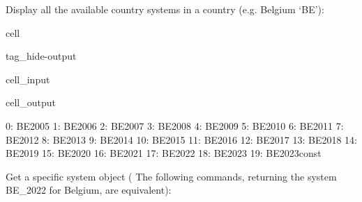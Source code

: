 \documentclass[letterpaper,10pt,english]{sphinxmanual}
\begin{document}
\sphinxAtStartPar
Display all the available country systems in a country (e.g. Belgium ‘BE’):

\begin{sphinxuseclass}{cell}
\begin{sphinxuseclass}{tag_hide-output}
\begin{sphinxuseclass}{cell_input}
\begin{sphinxVerbatim}[commandchars=\\\{\}]
\PYG{p}{[}\PYG{p}{]}
\end{sphinxVerbatim}

\end{sphinxuseclass}
\begin{sphinxuseclass}{cell_output}
\begin{sphinxVerbatim}[commandchars=\\\{\}]
0: BE\PYGZus{}2005       
1: BE\PYGZus{}2006       
2: BE\PYGZus{}2007       
3: BE\PYGZus{}2008       
4: BE\PYGZus{}2009       
5: BE\PYGZus{}2010       
6: BE\PYGZus{}2011       
7: BE\PYGZus{}2012       
8: BE\PYGZus{}2013       
9: BE\PYGZus{}2014       
10: BE\PYGZus{}2015      
11: BE\PYGZus{}2016      
12: BE\PYGZus{}2017      
13: BE\PYGZus{}2018      
14: BE\PYGZus{}2019      
15: BE\PYGZus{}2020      
16: BE\PYGZus{}2021      
17: BE\PYGZus{}2022      
18: BE\PYGZus{}2023      
19: BE\PYGZus{}2023\PYGZus{}const
\end{sphinxVerbatim}

\end{sphinxuseclass}
\end{sphinxuseclass}
\end{sphinxuseclass}
\sphinxAtStartPar
Get a specific system object ( The following commands, returning the system BE\_2022 for Belgium, are equivalent):
\end{document}
